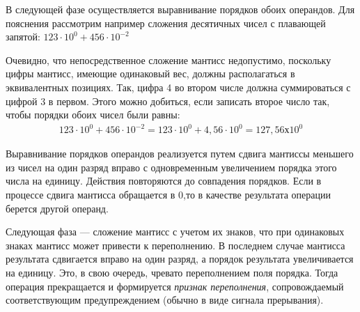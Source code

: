 \documentclass[a4paper,14pt]{extarticle}
\begin{document}
В следующей фазе осуществляется выравнивание порядков обоих операндов. Для пояснения рассмотрим например сложения десятичных чисел с плавающей запятой: $123 \cdot 10^0 + 456 \cdot 10^{-2}$

Очевидно, что непосредственное сложение мантисс недопустимо, поскольку цифры мантисс, имеющие одинаковый вес, должны располагаться в эквивалентных позициях. Так, цифра 4 во втором числе должна суммироваться с цифрой 3 в первом. Этого можно добиться, если записать второе число так, чтобы порядки обоих чисел были равны:
\begin{align*}
123 \cdot 10^0 + 456 \cdot 10^{-2}= 123 \cdot 10^0 + 4,56 \cdot 10^0 = 127,56 х 10^0
\end{align*}

Выравнивание порядков операндов реализуется путем сдвига мантиссы меньшего из чисел на один разряд вправо с одновременным увеличением порядка этого числа на единицу. Действия повторяются до совпадения порядков. Если в процессе сдвига мантисса обращается в 0,то в качестве результата операции берется другой операнд.

Следующая фаза --- сложение мантисс с учетом их знаков, что при одинаковых знаках мантисс может привести к переполнению. В последнем случае мантисса результата сдвигается вправо на один разряд, а порядок результата увеличивается на единицу. Это, в свою очередь, чревато переполнением поля порядка. Тогда операция прекращается и формируется \textit{признак переполнения}, сопровождаемый соответствующим предупреждением (обычно в виде сигнала прерывания).
\end{document}
